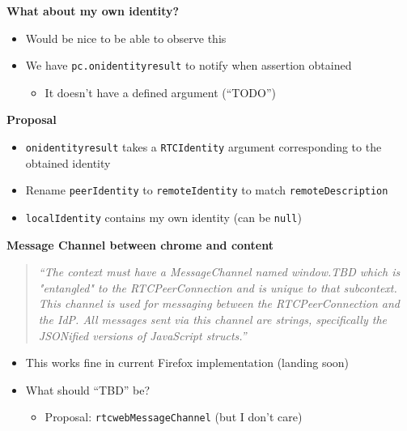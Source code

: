 \documentclass[helvetica]{seminar}
\newcommand{\heading}[1]{%
  \begin{center} 
    \large\bf 
    #1 
  \end{center} 
  \vspace{.4 in}}
\begin{document}
\begin{slide}
\heading{What about my own identity?}

\begin{itemize}
\item Would be nice to be able to observe this
\item We have \verb^pc.onidentityresult^ to notify when assertion obtained
  \begin{itemize}
    \item It doesn't have a defined argument (``TODO'')
  \end{itemize}
\end{itemize}
\end{slide}


\begin{slide}
\heading{Proposal}

\begin{itemize}
\item \verb^onidentityresult^ takes a \verb^RTCIdentity^ argument corresponding to the obtained identity
\item Rename \verb^peerIdentity^ to \verb^remoteIdentity^ to match \verb^remoteDescription^
\item \verb^localIdentity^ contains my own identity (can be \verb^null^)
\end{itemize}
\end{slide}

\begin{slide}
\heading{Message Channel between chrome and content}

\begin{quote}
\emph{``The context must have a MessageChannel named window.TBD which is "entangled" to the RTCPeerConnection and is unique to that subcontext. This channel is used for messaging between the RTCPeerConnection and the IdP. All messages sent via this channel are strings, specifically the JSONified versions of JavaScript structs.''}\end{quote}

\begin{itemize}
\item This works fine in current Firefox implementation (landing soon)
\item What should ``TBD'' be?
\begin{itemize}
\item Proposal: \verb^rtcwebMessageChannel^ (but I don't care)
\end{itemize}
\end{itemize}

\end{slide}
\end{document}
